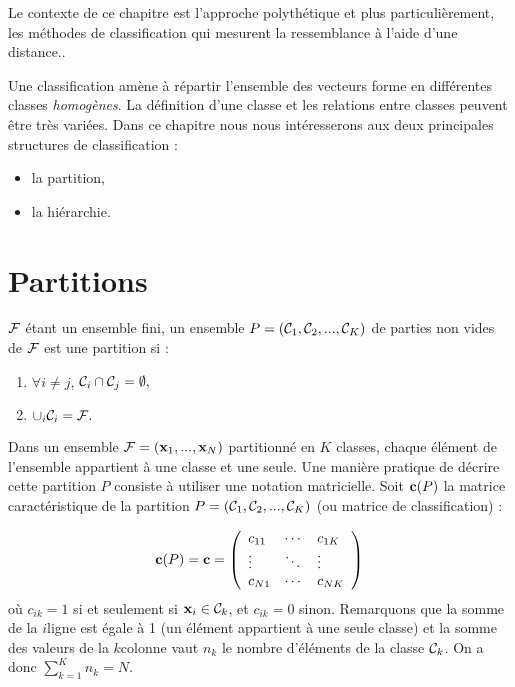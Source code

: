 Le contexte de  ce chapitre est  l'approche polyth\'etique et
plus particuli\`erement,  les m\'ethodes de classification
qui mesurent la ressemblance \`a l'aide d'une distance..

Une classification am\`ene \`a r\'epartir l'ensemble des vecteurs forme en diff\'erentes
classes {\em homog\`enes}. La d\'efinition d'une classe et les relations entre classes 
peuvent \^etre tr\`es vari\'ees. Dans ce chapitre nous nous int\'eresserons aux deux 
principales structures de classification :
\begin{itemize}
\item
la partition, 
\item
la hi\'erarchie. 
\end{itemize}

\section{Partitions}


\begin{defi}
${\cal F}$ \'etant un ensemble fini, un ensemble $P=({\cal C}_1,{\cal C}_2,...,{\cal C}_K)$ de parties non vides 
de ${\cal F}$ est une partition si :
\begin{enumerate}
\item $\forall i\neq j$, ${\cal C}_i \cap {\cal C}_j=\emptyset,$
\item $\cup_i {\cal C}_i={\cal F}.$ 
\end{enumerate}
\end{defi}


Dans un ensemble  ${\cal F}=(\mbox{\bf x}_1,...,\mbox{\bf x}_N)$  partitionn\'e en $K$ classes,
chaque \'el\'ement de l'ensemble
appartient \`a une classe et une seule. Une mani\`ere pratique de d\'ecrire
cette partition $P$ consiste \`a utiliser une notation matricielle. Soit $\mbox{\bf c}(P)$
la matrice caract\'eristique de la partition $P=({\cal C}_1,{\cal C}_2,...,{\cal C}_K)$ (ou matrice de classification) :

\[
\mbox{\bf c}(P)=\mbox{\bf c}=
\left(
\begin{array}{l l l} 
c_{11} & \cdots & c_{1K} \\
\vdots & \ddots & \vdots \\
c_{N1} & \cdots & c_{NK} \\
\end{array}
\right)
\] 
o\`u $c_{ik}=1$ si et seulement si $\mbox{\bf x}_i \in {\cal C}_k$, et $c_{ik}=0$ sinon. Remarquons que 
la somme de la $i$\ieme ligne est \'egale \`a 1 (un \'el\'ement appartient
\`a une seule classe) et la somme des valeurs de la $k$\ieme colonne vaut
$n_k$ le nombre d'\'el\'ements de la classe ${\cal C}_k$. On a donc 
$\sum_{k=1}^K n_k = N$.



